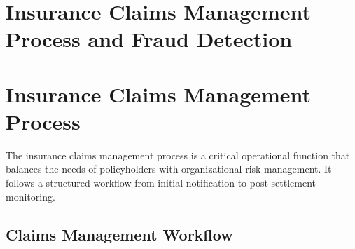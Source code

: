 \documentclass[12pt,a4paper]{article}
\begin{document}
\section*{Insurance Claims Management Process and Fraud Detection}

\section{Insurance Claims Management Process}

The insurance claims management process is a critical operational function that balances the needs of policyholders with organizational risk management. It follows a structured workflow from initial notification to post-settlement monitoring.

\subsection{Claims Management Workflow}
\end{document}
